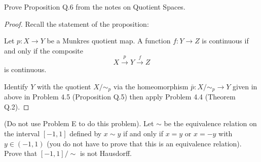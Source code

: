 \newpage
\begin{problem}[C]
Prove Proposition Q.6 from the notes on Quotient Spaces.
\end{problem}
\begin{proof}
Recall the statement of the proposition:
\begin{proposition*}[Proposition Q.6]
Let $p\colon X\to Y$ be a Munkres quotient map. A function
$f\colon Y\to Z$ is continuous if and only if the composite
\[
X\overset{p}{\longrightarrow}Y\overset{f}{\longrightarrow}Z
\]
is continuous.
\end{proposition*}
Identify $Y$ with the quotient $X/{\sim_p}$ via the homeomorphism
$\bar p\colon X/{\sim_p}\to Y$ given in above in Problem 4.5
(Proposition Q.5) then apply Problem 4.4 (Theorem Q.2).
\end{proof}
\newpage
\begin{problem}[D]
(Do not use Problem E to do this problem). Let $\sim$ be the
equivalence relation on the interval $[-1,1]$ defined by $x\sim
y$ if and only if $x=y$ or $x=-y$ with $y\in(-1,1)$ (you do not
have to prove that this is an equivalence relation). Prove that
$[-1,1]/{\sim}$ is not Hausdorff.
\end{problem}
